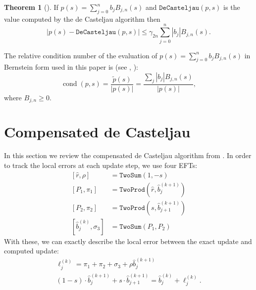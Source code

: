 \documentclass[letterpaper,10pt]{article}
\theoremstyle{definition}
\newtheorem{theorem}{Theorem}
\newcommand{\cond}[1]{\operatorname{cond}\left(#1\right)}
\begin{document}
\begin{theorem}[\cite{Mainar1999}]
If \(p(s) = \sum_{j = 0}^n b_j B_{j, n}(s)\) and \(\mathtt{DeCasteljau}(p, s)\)
is the value computed by the de Casteljau algorithm then
\begin{equation}
\left|p(s) - \mathtt{DeCasteljau}(p, s)\right| \leq \gamma_{2n}
\sum_{j = 0}^n \left|b_j\right| B_{j, n}(s).
\end{equation}
\end{theorem}

The relative condition number of the evaluation of \(p(s) = \sum_{j = 0}^n
b_j B_{j, n}(s)\) in Bernstein form used in this paper is (see
\cite{Mainar1999}, \cite{Farouki1987}):
\begin{equation}
\cond{p, s} = \frac{\widetilde{p}\left(s\right)}{
  \left|p(s)\right|} = \frac{\sum_j \left|b_j\right| B_{j, n}(s)}{
  \left|p(s)\right|},
\end{equation}
where \(B_{j, n} \geq 0\).

\section{Compensated de Casteljau}\label{compensated-2}

In this section we review the compensated de Casteljau algorithm
from \cite{Jiang2010}. In order to track the local errors at
each update step, we use four EFTs:
\begin{align}
\left[\widehat{r}, \rho\right] &= \mathtt{TwoSum}(1, -s) \\
\left[P_1, \pi_1\right] &= \mathtt{TwoProd}\left(\widehat{r}, \widehat{b}_j^{(k + 1)}\right) \\
\left[P_2, \pi_2\right] &= \mathtt{TwoProd}\left(s, \widehat{b}_{j + 1}^{(k + 1)}\right) \\
\left[\widehat{b}_j^{(k)}, \sigma_3\right] &= \mathtt{TwoSum}(P_1, P_2)
\end{align}
With these, we can exactly describe the local error between the exact
update and computed update:
\begin{gather}
\ell_j^{(k)} = \pi_1 + \pi_2 + \sigma_3 + \rho\widehat{b}_j^{(k + 1)} \label{ell-j} \\
(1 - s) \cdot \widehat{b}_j^{(k + 1)} +
  s \cdot \widehat{b}_{j + 1}^{(k + 1)} =
\widehat{b}_j^{(k)} + \ell_j^{(k)}.
\end{gather}
\end{document}
